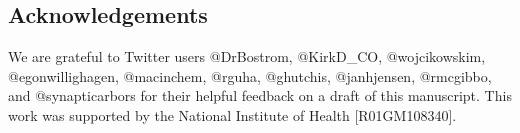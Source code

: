 \subsection*{Acknowledgements}
We are grateful to Twitter users @DrBostrom,
@KirkD_CO,
@wojcikowskim,
@egonwillighagen,
@macinchem,
@rguha,
@ghutchis,
@janhjensen,
@rmcgibbo, and
@synapticarbors for their helpful feedback on a draft of this manuscript.
This work was supported by the National Institute of Health [R01GM108340].